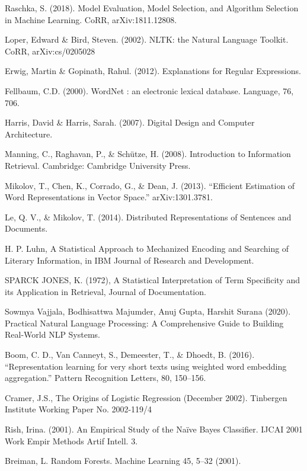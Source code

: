 \documentclass[runningheads]{llncs}
\begin{document}
\begin{thebibliography}{00}
Raschka, S. (2018). Model Evaluation, Model Selection, and Algorithm Selection in Machine Learning. CoRR, arXiv:1811.12808.

Loper, Edward \& Bird, Steven. (2002). NLTK: the Natural Language Toolkit. CoRR, arXiv:cs/0205028

Erwig, Martin \& Gopinath, Rahul. (2012). Explanations for Regular Expressions.

Fellbaum, C.D. (2000). WordNet : an electronic lexical database. Language, 76, 706.

Harris, David \& Harris, Sarah. (2007). Digital Design and Computer Architecture. 

Manning, C., Raghavan, P., \& Schütze, H. (2008). Introduction to Information Retrieval. Cambridge: Cambridge University Press.

Mikolov, T., Chen, K., Corrado, G., \& Dean, J. (2013). “Efficient Estimation of Word Representations in Vector Space.” arXiv:1301.3781.

Le, Q. V., \& Mikolov, T. (2014). Distributed Representations of Sentences and Documents.

H. P. Luhn, A Statistical Approach to Mechanized Encoding and Searching of Literary Information, in IBM Journal of Research and Development.

SPARCK JONES, K. (1972), A Statistical Interpretation of Term Specificity and its Application in Retrieval, Journal of Documentation.

Sowmya Vajjala, Bodhisattwa Majumder, Anuj Gupta, Harshit Surana (2020). Practical Natural Language Processing: A Comprehensive Guide to Building Real-World NLP Systems.

Boom, C. D., Van Canneyt, S., Demeester, T., \& Dhoedt, B. (2016). “Representation learning for very short texts using weighted word embedding aggregation.” Pattern Recognition Letters, 80, 150–156.

Cramer, J.S., The Origins of Logistic Regression (December 2002). Tinbergen Institute Working Paper No. 2002-119/4

Rish, Irina. (2001). An Empirical Study of the Naïve Bayes Classifier. IJCAI 2001 Work Empir Methods Artif Intell. 3.

Breiman, L. Random Forests. Machine Learning 45, 5–32 (2001).


\end{thebibliography}
\end{document}
